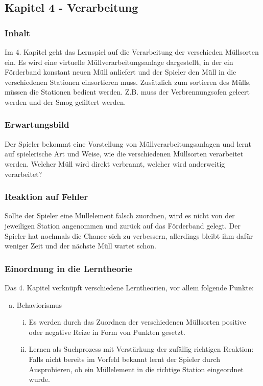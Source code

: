\documentclass[a4paper]{article}
\begin{document}
    \subsection{Kapitel 4 - Verarbeitung}
        \subsubsection{Inhalt}
            Im 4. Kapitel geht das Lernspiel auf die Verarbeitung der verschieden Müllsorten ein. Es wird eine virtuelle Müllverarbeitungsanlage dargestellt, in der ein Förderband konstant neuen Müll anliefert und der Spieler den Müll in die verschiedenen Stationen einsortieren muss. Zusätzlich zum sortieren des Mülls, müssen die Stationen bedient werden. Z.B. muss der Verbrennungsofen geleert werden und der Smog gefiltert werden.
        \subsubsection{Erwartungsbild}
            Der Spieler bekommt eine Vorstellung von Müllverarbeitungsanlagen und lernt auf spielerische Art und Weise, wie die verschiedenen Müllsorten verarbeitet werden. Welcher Müll wird direkt verbrannt, welcher wird anderweitig verarbeitet?
        \subsubsection{Reaktion auf Fehler}
            Sollte der Spieler eine Müllelement falsch zuordnen, wird es nicht von der jeweiligen Station angenommen und zurück auf das Förderband gelegt. Der Spieler hat nochmals die Chance sich zu verbessern, allerdings bleibt ihm dafür weniger Zeit und der nächste Müll wartet schon.
        \subsubsection{Einordnung in die Lerntheorie}
            Das 4. Kapitel verknüpft verschiedene Lerntheorien, vor allem folgende Punkte:
            \begin{enumerate}[(a)]
                \item Behaviorismus
                \begin{enumerate}[(i)]
                    \item Es werden durch das Zuordnen der verschiedenen Müllsorten positive oder negative Reize in Form von Punkten gesetzt.

                    \item Lernen als Suchprozess mit Verstärkung der zufällig richtigen Reaktion:\\
                    Falls nicht bereits im Vorfeld bekannt lernt der Spieler durch Ausprobieren, ob ein Müllelement in die richtige Station eingeordnet wurde.
                \end{enumerate}
            \end{enumerate}
\end{document}
